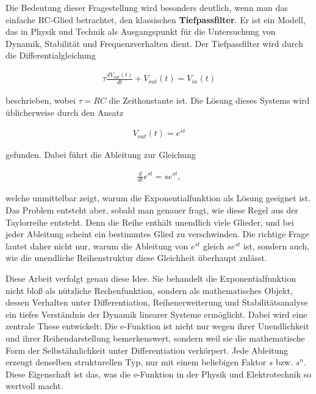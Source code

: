 \documentclass[a4paper,12pt,twoside]{report}
\theoremstyle{definition}
\begin{document}
Die Bedeutung dieser Fragestellung wird besonders deutlich, wenn man das einfache RC-Glied betrachtet, den klassischen \textbf{Tiefpassfilter}. Er ist ein Modell, das in Physik und Technik als Ausgangspunkt für die Untersuchung von Dynamik, Stabilität und Frequenzverhalten dient. Der Tiefpassfilter wird durch die Differentialgleichung

\begin{align}
    \tau \frac{dV_{out}(t)}{dt} + V_{out}(t) = V_{in}(t)
\end{align}

beschrieben, wobei $\tau = RC$ die Zeitkonstante ist. Die Lösung dieses Systems wird üblicherweise durch den Ansatz

\begin{align}
    V_{out}(t) = e^{st}
\end{align}

gefunden. Dabei führt die Ableitung zur Gleichung

\begin{align}
    \frac{d}{dt} e^{st} = s e^{st},
\end{align}

welche unmittelbar zeigt, warum die Exponentialfunktion als Lösung geeignet ist. Das Problem entsteht aber, sobald man genauer fragt, wie diese Regel aus der Taylorreihe entsteht. Denn die Reihe enthält unendlich viele Glieder, und bei jeder Ableitung scheint ein bestimmtes Glied zu verschwinden. Die richtige Frage lautet daher nicht nur, warum die Ableitung von $e^{st}$ gleich $s e^{st}$ ist, sondern auch, wie die unendliche Reihenstruktur diese Gleichheit überhaupt zulässt.

Diese Arbeit verfolgt genau diese Idee. Sie behandelt die Exponentialfunktion nicht bloß als nützliche Rechenfunktion, sondern als mathematisches Objekt, dessen Verhalten unter Differentiation, Reihenerweiterung und Stabilitätsanalyse ein tiefes Verständnis der Dynamik linearer Systeme ermöglicht. Dabei wird eine zentrale These entwickelt: Die e-Funktion ist nicht nur wegen ihrer Unendlichkeit und ihrer Reihendarstellung bemerkenswert, sondern weil sie die mathematische Form der Selbstähnlichkeit unter Differentiation verkörpert. Jede Ableitung erzeugt denselben strukturellen Typ, nur mit einem beliebigen Faktor $s$ bzw. $s^n$. Diese Eigenschaft ist das, was die e-Funktion in der Physik und Elektrotechnik so wertvoll macht.
\end{document}
